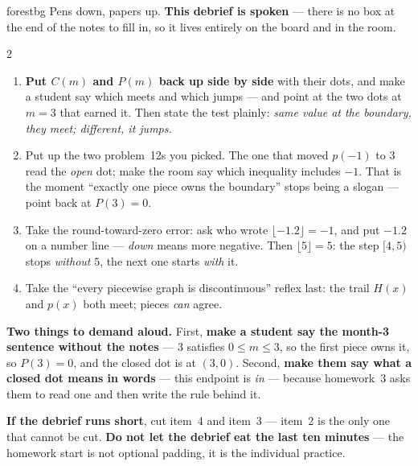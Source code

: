 \documentclass[10pt]{article}
\begin{document}
\boxguard
\begin{skillbox}{forestbg}
Pens down, papers up. \textbf{This debrief is spoken} --- there is no box at the end of the
notes to fill in, so it lives entirely on the board and in the room.
\begin{multicols}{2}
\begin{enumerate}[leftmargin=1.3em, nosep, itemsep=3pt]
  \item \textbf{Put $C(m)$ and $P(m)$ back up side by side} with their dots, and make a student
        say which meets and which jumps --- and point at the two dots at $m=3$ that earned it.
        Then state the test plainly: \emph{same value at the boundary, they meet; different, it
        jumps.}
  \item Put up the two problem~12s you picked. The one that moved $p(-1)$ to $3$ read the
        \emph{open} dot; make the room say which inequality includes $-1$. That is the moment
        ``exactly one piece owns the boundary'' stops being a slogan --- point back at $P(3)=0$.
  \item Take the round-toward-zero error: ask who wrote $\lfloor-1.2\rfloor=-1$, and put $-1.2$
        on a number line --- \emph{down} means more negative. Then $\lfloor5\rfloor=5$: the step
        $[4,5)$ stops \emph{without} $5$, the next one starts \emph{with} it.
  \item Take the ``every piecewise graph is discontinuous'' reflex last: the trail $H(x)$ and
        $p(x)$ both meet; pieces \emph{can} agree.
\end{enumerate}
\columnbreak
\textbf{Two things to demand aloud.} First, \textbf{make a student say the month-3 sentence
without the notes} --- $3$ satisfies $0\le m\le3$, so the first piece owns it, so $P(3)=0$, and
the closed dot is at $(3,0)$. Second, \textbf{make them say what a closed dot means in words} ---
this endpoint is \emph{in} --- because homework~3 asks them to read one and then write the rule
behind it.

\textbf{If the debrief runs short}, cut item~4 and item~3 --- item~2 is the only one that cannot
be cut. \textbf{Do not let the debrief eat the last ten minutes} --- the homework start is not
optional padding, it is the individual practice.
\end{multicols}
\end{skillbox}
\end{document}
